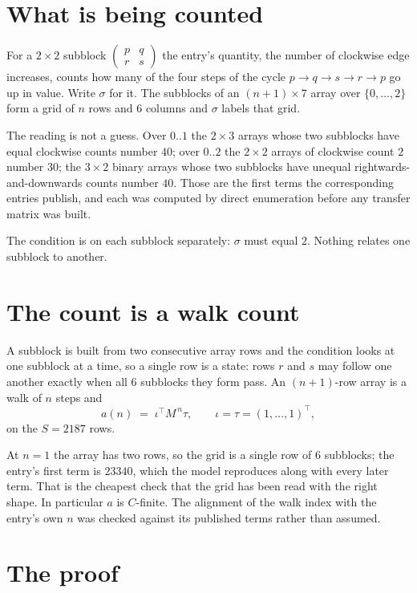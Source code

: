 \documentclass[11pt,a4paper]{article}
\theoremstyle{plain}
\theoremstyle{definition}
\begin{document}
\section{What is being counted}

For a $2\times2$ subblock $\begin{pmatrix}p&q\\r&s\end{pmatrix}$ the
entry's quantity, the number of clockwise edge increases, counts how many of the four steps of the cycle $p\to q\to s\to r\to p$ go up in value. Write $\sigma$ for it. The subblocks of an
$(n+1)\times7$ array over $\{0,\dots,2\}$ form a grid of $n$ rows and $6$
columns and $\sigma$ labels that grid.

The reading is not a guess. Over $0..1$ the $2\times3$ arrays whose two subblocks have equal
clockwise counts number $40$; over $0..2$ the $2\times2$ arrays of clockwise count $2$ number
$30$; the $3\times2$ binary arrays whose two subblocks have unequal rightwards-and-downwards
counts number $40$. Those are the first terms the corresponding entries publish, and each was
computed by direct enumeration before any transfer matrix was built.

The condition is on each subblock separately: $\sigma$ must equal $2$. Nothing
relates one subblock to another.

\section{The count is a walk count}

A subblock is built from two consecutive array rows and the condition looks
at one subblock at a time, so a single row is a state: rows $r$ and $s$ may follow one another
exactly when all $6$ subblocks they form pass. An $(n+1)$-row array is a walk of $n$ steps and
\[
a(n)\;=\;\iota^{\!\top}M^{\,n}\tau,\qquad\iota=\tau=(1,\dots,1)^{\!\top},
\]
on the $S=2187$ rows.

At $n=1$ the array has two rows, so the grid is a single row of $6$
subblocks; the entry's first term is $23340$, which the model
reproduces along with every later term. That is the cheapest check that the grid has been read
with the right shape.
In particular $a$ is $C$-finite. The alignment of the walk index with the entry's own $n$ was
checked against its published terms rather than assumed.

\section{The proof}
\end{document}
